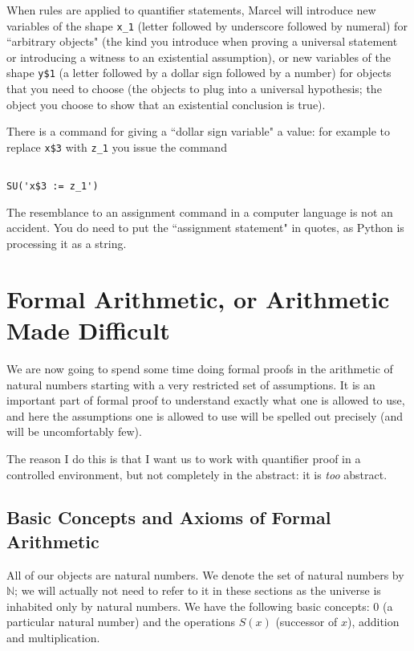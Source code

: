 \documentclass[12pt]{article}
\begin{document}
When rules are applied to quantifier statements, Marcel will introduce new variables of the shape {\tt x\_1}  (letter followed by underscore followed by numeral) for ``arbitrary objects" (the kind you introduce when proving a universal statement or introducing a witness to an existential assumption), or new variables of the shape {\tt y\$1} (a letter followed by a dollar sign followed by a number) for objects that you need to choose (the objects to plug into a universal hypothesis;  the object you choose to show that an existential conclusion is true).

There is a command for giving a ``dollar sign variable" a value:  for example to replace {\tt x\$3} with {\tt z\_1} you issue the command

\begin{verbatim}

SU('x$3 := z_1')

\end{verbatim}

The resemblance to an assignment command in a computer language is not an accident.  You do need to put the ``assignment statement" in quotes, as Python is processing it as a string.

\section{Formal Arithmetic, or Arithmetic Made Difficult}

We are now going to spend some time doing formal proofs in the
arithmetic of natural numbers starting with a very restricted set of
assumptions.  It is an important part of formal proof to understand
exactly what one is allowed to use, and here the assumptions one is
allowed to use will be spelled out precisely (and will be
uncomfortably few).

The reason I do this is that I want us to work with quantifier proof in a controlled environment, but not completely in the abstract:  it is {\em too\/} abstract.

\subsection{Basic Concepts and Axioms of Formal Arithmetic}

All of our objects are natural numbers.  We denote the set of natural
numbers by ${\mathbb N}$; we will actually not need to refer to it in
these sections as the universe is inhabited only by natural numbers.
We have the following basic concepts:  0 (a particular natural number)
and the operations $S(x)$ (successor of $x$), addition and multiplication.
\end{document}
